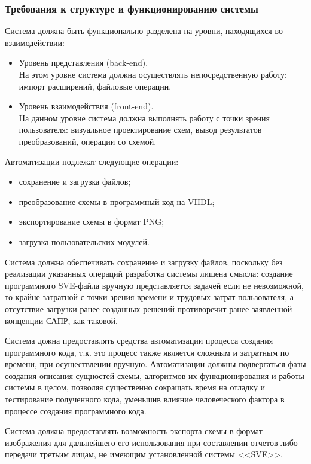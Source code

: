 \subsubsection{Требования к структуре и функционированию системы} \label{sec:requirements:system}
Система должна быть функционально разделена на уровни, находящихся во взаимодействии:
\begin{itemize}
  \item Уровень представления (back-end).\\
  На этом уровне система должна осуществлять непосредственную работу: импорт расширений, файловые операции.
  \item Уровень взаимодействия (front-end).\\
  На данном уровне система должна выполнять работу с точки зрения пользователя: визуальное проектирование схем, вывод результатов преобразований, операции со схемой.
\end{itemize}

Автоматизации подлежат следующие операции:
\begin{itemize}
  \item сохранение и загрузка файлов;
  \item преобразование схемы в программный код на VHDL;
  \item экспортирование схемы в формат PNG;
  \item загрузка пользовательских модулей.
\end{itemize}

Система должна обеспечивать сохранение и загрузку файлов, поскольку без реализации указанных операций разработка системы лишена смысла: создание программного SVE-файла вручную представляется задачей если не невозможной, то крайне затратной с точки зрения времени и трудовых затрат пользователя, а отсутствие загрузки ранее созданных решений противоречит ранее заявленной концепции САПР, как таковой.

Система дожна предоставлять средства автоматизации процесса создания программного кода, т.к. это процесс также является сложным и затратным по времени, при осуществлении вручную.
Автоматизации должны подвергаться фазы создания описания сущностей схемы, алгоритмов их функционирования и работы системы в целом, позволяя существенно сокращать время на отладку и тестирование полученного кода, уменьшив влияние человеческого фактора в процессе создания программного кода.

Система должна предоставлять возможность экспорта схемы в формат изображения для дальнейшего его использования при составлении отчетов либо передачи третьим лицам, не имеющим установленной системы <<SVE>>.

